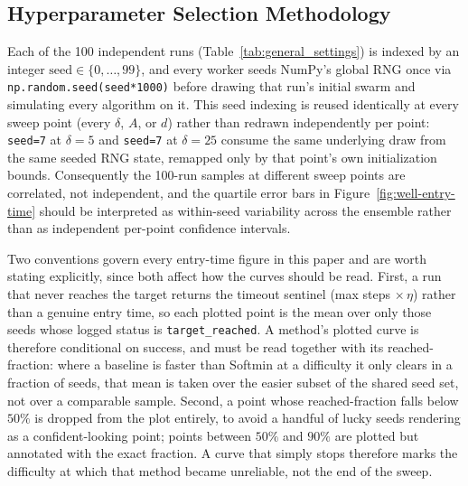 \documentclass{article} %
\theoremstyle{plain}
\theoremstyle{definition}
\theoremstyle{remark}
\begin{document}
\subsection{Hyperparameter Selection Methodology}
\label{app:hyperparameter-methodology}

Each of the 100 independent runs (Table~\ref{tab:general_settings}) is indexed by an integer $\text{seed}\in\{0,\dots,99\}$, and every worker seeds NumPy's global RNG once via \texttt{np.random.seed(seed*1000)} before drawing that run's initial swarm and simulating every algorithm on it. This seed indexing is reused identically at every sweep point (every $\delta$, $A$, or $d$) rather than redrawn independently per point: \texttt{seed=7} at $\delta=5$ and \texttt{seed=7} at $\delta=25$ consume the same underlying draw from the same seeded RNG state, remapped only by that point's own initialization bounds. Consequently the 100-run samples at different sweep points are correlated, not independent, and the quartile error bars in Figure~\ref{fig:well-entry-time} should be interpreted as within-seed variability across the ensemble rather than as independent per-point confidence intervals.

Two conventions govern every entry-time figure in this paper and are worth stating explicitly, since both affect how the curves should be read. First, a run that never reaches the target returns the timeout sentinel (max steps $\times\,\eta$) rather than a genuine entry time, so each plotted point is the mean over only those seeds whose logged status is \texttt{target\_reached}. A method's plotted curve is therefore conditional on success, and must be read together with its reached-fraction: where a baseline is faster than Softmin at a difficulty it only clears in a fraction of seeds, that mean is taken over the easier subset of the shared seed set, not over a comparable sample. Second, a point whose reached-fraction falls below $50\%$ is dropped from the plot entirely, to avoid a handful of lucky seeds rendering as a confident-looking point; points between $50\%$ and $90\%$ are plotted but annotated with the exact fraction. A curve that simply stops therefore marks the difficulty at which that method became unreliable, not the end of the sweep.
\end{document}
